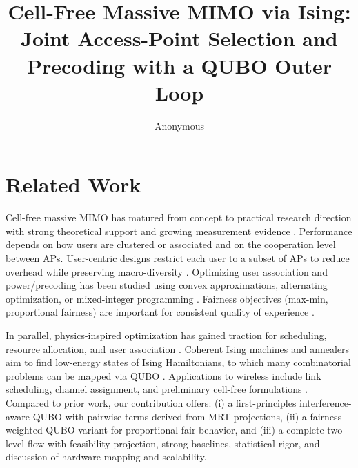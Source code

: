 {\section{Related Work}

Cell-free massive MIMO has matured from concept to practical research direction with strong theoretical support and growing measurement evidence \cite{ngo2017cell,demir2021foundations,bjornson2019massive}. Performance depends on how users are clustered or associated and on the cooperation level between APs. User-centric designs restrict each user to a subset of APs to reduce overhead while preserving macro-diversity \cite{buzzi2019user,chen2020structured}. Optimizing user association and power/precoding has been studied using convex approximations, alternating optimization, or mixed-integer programming \cite{nayebi2017precoding,bjornson2019making}. Fairness objectives (max-min, proportional fairness) are important for consistent quality of experience \cite{bashar2021max}.

In parallel, physics-inspired optimization has gained traction for scheduling, resource allocation, and user association \cite{kasi2021resource,grassl2022ising}. Coherent Ising machines and annealers aim to find low-energy states of Ising Hamiltonians, to which many combinatorial problems can be mapped via QUBO \cite{lucas2014ising,mcmahon2016fully,inagaki2016coherent,glover2018tutorial}. Applications to wireless include link scheduling, channel assignment, and preliminary cell-free formulations \cite{zhao2022joint}. Compared to prior work, our contribution offers: (i) a first-principles interference-aware QUBO with pairwise terms derived from MRT projections, (ii) a fairness-weighted QUBO variant for proportional-fair behavior, and (iii) a complete two-level flow with feasibility projection, strong baselines, statistical rigor, and discussion of hardware mapping and scalability.

\usepackage{algorithm}
\usepackage{algpseudocode}
\usepackage{booktabs}
\usepackage{siunitx}
\usepackage{cite}
\usepackage{hyperref}
\hypersetup{colorlinks=true, linkcolor=black, citecolor=black, urlcolor=black}

\newcommand{\E}{\mathbb{E}}
\newcommand{\R}{\mathbb{R}}
\newcommand{\1}{\mathbf{1}}



\title{Cell-Free Massive MIMO via Ising: Joint Access-Point Selection and Precoding with a QUBO Outer Loop}
\author{Anonymous}
\maketitle

}
